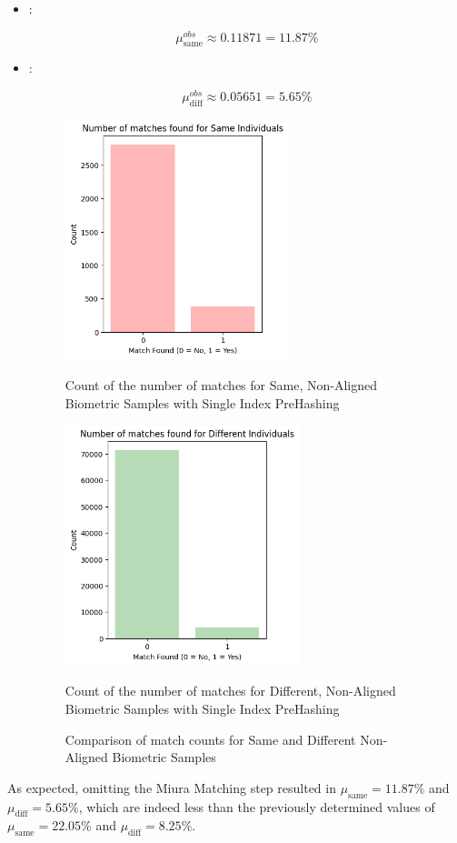 \begin{itemize}
    \item {}: 
    
    \[ \mu_{\text{same}}^{obs} \approx 0.11871 = 11.87\%\]
    
    \item {}:
    
    \[ \mu_{\text{diff}}^{obs} \approx 0.05651 = 5.65\% \]

    \begin{figure}[H]
        \centering
        \begin{minipage}[b]{0.48\linewidth}
            \centering
            \includegraphics[width=\linewidth,height=7cm,keepaspectratio]{latex-img/mu_same_without_postAlignment.png}
            \caption{Count of the number of matches for Same, Non-Aligned Biometric Samples with Single Index PreHashing}
            \label{mu_same_without_postAlignement}
        \end{minipage}
        \hfill
        \begin{minipage}[b]{0.48\linewidth}
            \centering
            \includegraphics[width=\linewidth,height=7cm,keepaspectratio]{latex-img/mu_diff_without_postAlignment.png}
            \caption{Count of the number of matches for Different, Non-Aligned Biometric Samples with Single Index PreHashing}
            \label{mu_diff_without_postAlignement}
        \end{minipage}
        \caption{Comparison of match counts for Same and Different Non-Aligned Biometric Samples}
    \end{figure}
\end{itemize}

As expected, omitting the Miura Matching step resulted in \(\mu_{\text{same}} = 11.87\%\) and \(\mu_{\text{diff}} = 5.65\%\), which are indeed less than the previously determined values of \(\mu_{\text{same}} = 22.05\%\) and \(\mu_{\text{diff}} = 8.25\%\).

